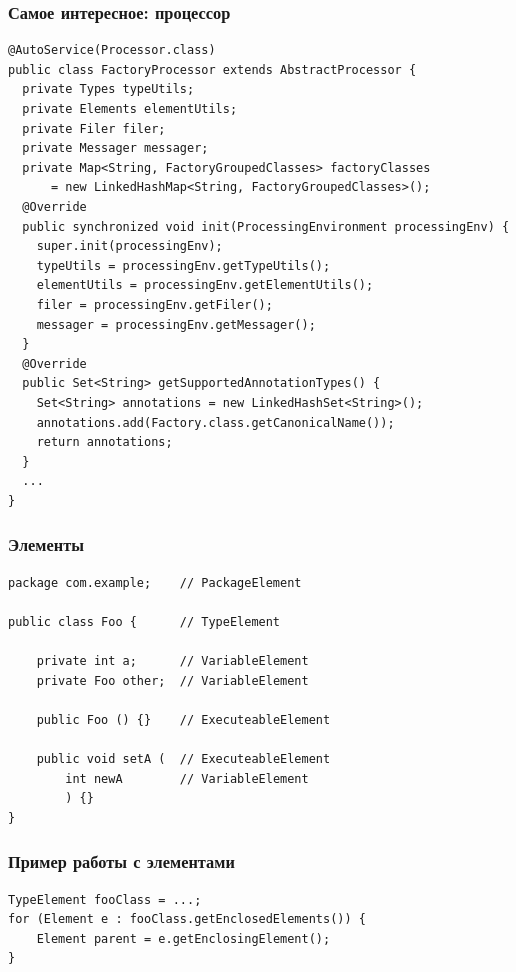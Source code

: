 \documentclass[xetex,mathserif,serif]{beamer}
\begin{document}
	\begin{frame}[fragile]
		\frametitle{Самое интересное: процессор}
		\begin{scriptsize}
			\begin{verbatim}
@AutoService(Processor.class)
public class FactoryProcessor extends AbstractProcessor {
  private Types typeUtils;
  private Elements elementUtils;
  private Filer filer;
  private Messager messager;
  private Map<String, FactoryGroupedClasses> factoryClasses 
      = new LinkedHashMap<String, FactoryGroupedClasses>();
  @Override
  public synchronized void init(ProcessingEnvironment processingEnv) {
    super.init(processingEnv);
    typeUtils = processingEnv.getTypeUtils();
    elementUtils = processingEnv.getElementUtils();
    filer = processingEnv.getFiler();
    messager = processingEnv.getMessager();
  }
  @Override
  public Set<String> getSupportedAnnotationTypes() {
    Set<String> annotations = new LinkedHashSet<String>();
    annotations.add(Factory.class.getCanonicalName());
    return annotations;
  }
  ...
}
			\end{verbatim}
		\end{scriptsize}
\end{frame}

	\begin{frame}[fragile]
		\frametitle{Элементы}
		\begin{small}
			\begin{verbatim}
package com.example;    // PackageElement

public class Foo {      // TypeElement

    private int a;      // VariableElement
    private Foo other;  // VariableElement

    public Foo () {}    // ExecuteableElement

    public void setA (  // ExecuteableElement
        int newA        // VariableElement
        ) {}
}
			\end{verbatim}
		\end{small}
\end{frame}

	\begin{frame}[fragile]
		\frametitle{Пример работы с элементами}
		\begin{verbatim}
TypeElement fooClass = ...;
for (Element e : fooClass.getEnclosedElements()) {
    Element parent = e.getEnclosingElement();
}
		\end{verbatim}
\end{frame}
\end{document}
